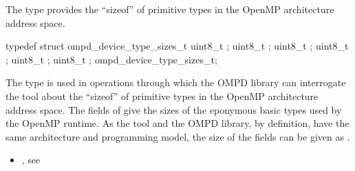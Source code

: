 \summary
The  type provides the ``sizeof'' of 
primitive types in the OpenMP architecture address space.

\format

\begin{ccppspecific}
\begin{ompSyntax}
typedef struct ompd_device_type_sizes_t {
  uint8_t ;
  uint8_t ;
  uint8_t ;
  uint8_t ;
  uint8_t ;
  uint8_t ;
} ompd_device_type_sizes_t;
\end{ompSyntax}
\end{ccppspecific}


\descr
The  type is used in operations through which 
the OMPD library can interrogate the tool about the ``sizeof'' of primitive 
types in the OpenMP architecture address space. The fields of 
 give the sizes of the eponymous basic types 
used by the OpenMP runtime. As the tool and the OMPD library, by definition, 
have the same architecture and programming model, the size of the fields can 
be given as .

\crossreferences
\begin{itemize}
\item {}, 
see 
\end{itemize}
